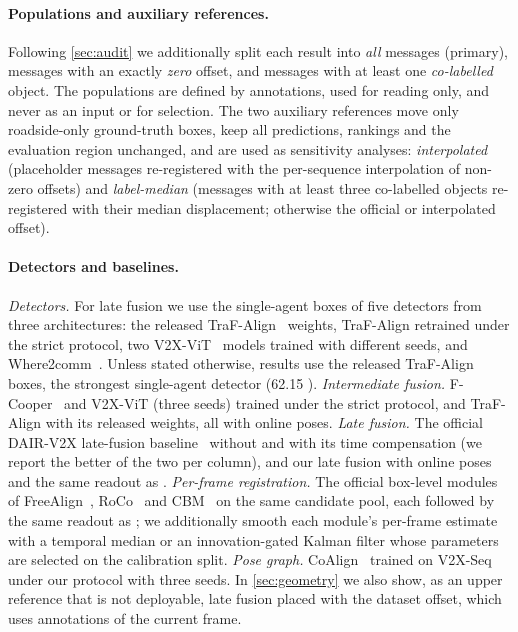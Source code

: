 \paragraph{Populations and auxiliary references.}
Following \cref{sec:audit} we additionally split each result into \emph{all} messages (primary), messages with an exactly \emph{zero} offset, and messages with at least one \emph{co-labelled} object.
The populations are defined by annotations, used for reading only, and never as an input or for selection.
The two auxiliary references move only roadside-only ground-truth boxes, keep all predictions, rankings and the evaluation region unchanged, and are used as sensitivity analyses:
\emph{interpolated} (placeholder messages re-registered with the per-sequence interpolation of non-zero offsets) and \emph{label-median} (messages with at least three co-labelled objects re-registered with their median displacement; otherwise the official or interpolated offset).

\paragraph{Detectors and baselines.}
\emph{Detectors.} For late fusion we use the single-agent boxes of five detectors from three architectures: the released TraF-Align~\cite{song2025trafalign} weights, TraF-Align retrained under the strict protocol, two V2X-ViT~\cite{xu2022v2xvit} models trained with different seeds, and Where2comm~\cite{hu2022where2comm}.
Unless stated otherwise, results use the released TraF-Align boxes, the strongest single-agent detector (62.15 \apseven).
\emph{Intermediate fusion.} F-Cooper~\cite{chen2019fcooper} and V2X-ViT (three seeds) trained under the strict protocol, and TraF-Align with its released weights, all with online poses.
\emph{Late fusion.} The official DAIR-V2X late-fusion baseline~\cite{yu2022dairv2x} without and with its time compensation (we report the better of the two per column), and our late fusion with online poses and the same readout as \method.
\emph{Per-frame registration.} The official box-level modules of FreeAlign~\cite{lei2024freealign}, RoCo~\cite{huang2024roco} and CBM~\cite{song2023cbm} on the same candidate pool, each followed by the same readout as \method; we additionally smooth each module's per-frame estimate with a temporal median or an innovation-gated Kalman filter whose parameters are selected on the calibration split.
\emph{Pose graph.} CoAlign~\cite{lu2023coalign} trained on V2X-Seq under our protocol with three seeds.
In \cref{sec:geometry} we also show, as an upper reference that is not deployable, late fusion placed with the dataset offset, which uses annotations of the current frame.

